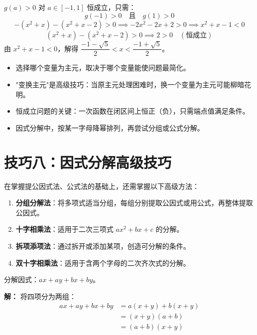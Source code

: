 \documentclass[12pt, a4paper]{ctexart}
\begin{document}
$g(a) > 0$ 对 $a \in [-1,1]$ 恒成立，只需：
\[
g(-1) > 0 \quad \text{且} \quad g(1) > 0
\]
\[
-(x^2+x) - (x^2+x-2) > 0 \implies -2x^2 - 2x + 2 > 0 \implies x^2+x-1 < 0
\]
\[
(x^2+x) - (x^2+x-2) > 0 \implies 2 > 0 \quad (\text{恒成立})
\]
由 $x^2+x-1 < 0$，解得 $\dfrac{-1-\sqrt{5}}{2} < x < \dfrac{-1+\sqrt{5}}{2}$。

\begin{tipbox}[主元法要点总结]
\begin{itemize}[leftmargin=1.5em]
  \item 选择哪个变量为主元，取决于哪个变量能使问题最简化。
  \item "变换主元"是高级技巧：当原主元处理困难时，换一个变量为主元可能柳暗花明。
  \item 恒成立问题的关键：一次函数在闭区间上恒正（负），只需端点值满足条件。
  \item 因式分解中，按某一字母降幂排列，再尝试分组或公式分解。
\end{itemize}
\end{tipbox}

\section*{\textcolor{mainblue}{技巧八：因式分解高级技巧}}

\begin{knowledgebox}[因式分解高级技巧概述]
在掌握提公因式法、公式法的基础上，还需掌握以下高级方法：
\begin{enumerate}[leftmargin=2em]
  \item \textbf{分组分解法}：将多项式适当分组，每组分别提取公因式或用公式，再整体提取公因式。
  \item \textbf{十字相乘法}：适用于二次三项式 $ax^2+bx+c$ 的分解。
  \item \textbf{拆项添项法}：通过拆开或添加某项，创造可分解的条件。
  \item \textbf{双十字相乘法}：适用于含两个字母的二次齐次式的分解。
\end{enumerate}
\end{knowledgebox}

\begin{examplebox}[【例16】分组分解法]
分解因式：$ax + ay + bx + by$。
\end{examplebox}

\textbf{解：} 将四项分为两组：
\begin{align*}
ax + ay + bx + by &= a(x+y) + b(x+y) \\
&= (x+y)(a+b) \\
&= \boxed{(a+b)(x+y)}
\end{align*}
\end{document}
